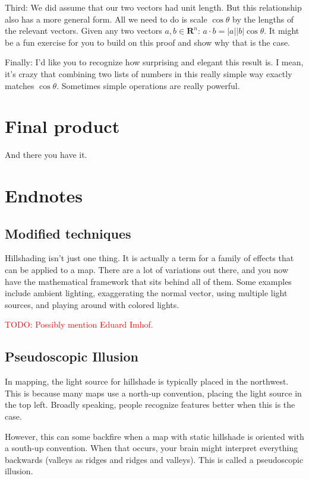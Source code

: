 \documentclass{article}
\newcommand\todo[1]{\textcolor{red}{TODO: #1}}
\begin{document}
Third: We did assume that our two vectors had unit length.
But this relationship also has a more general form.
All we need to do is scale $\cos \theta$ by the lengths of the relevant vectors.
Given any two vectors $ a, b \in \mathbf{R}^n$: $a \cdot b = |a| |b| \cos \theta$.
It might be a fun exercise for you to build on this proof and show why that is the case.

Finally: I'd like you to recognize how surprising and elegant this result is.
I mean, it's crazy that combining two lists of numbers in this really simple way exactly matches $\cos \theta$.
Sometimes simple operations are really powerful.

\section{Final product}

And there you have it.

\section{Endnotes}

\subsection{Modified techniques}

Hillshading isn't just one thing.
It is actually a term for a family of effects that can be applied to a map.
There are a lot of variations out there, and you now have the mathematical framework that sits behind all of them.
Some examples include ambient lighting, exaggerating the normal vector, using multiple light sources, and playing around with colored lights.

\todo{Possibly mention Eduard Imhof.}

\subsection{Pseudoscopic Illusion}

In mapping, the light source for hillshade is typically placed in the northwest.
This is because many maps use a north-up convention, placing the light source in the top left.
Broadly speaking, people recognize features better when this is the case.

However, this can some backfire when a map with static hillshade is oriented with a south-up convention.
When that occurs, your brain might interpret everything backwards (valleys as ridges and ridges and valleys).
This is called a pseudoscopic illusion.
\end{document}
